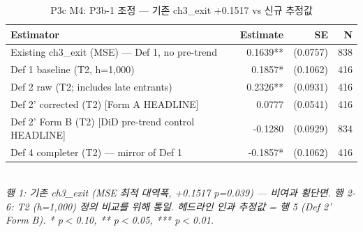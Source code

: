 \begin{table}[t]
\centering
\caption{P3c M4: P3b-1 조정 — 기존 ch3\_exit +0.1517 vs 신규 추정값}
\label{tab:ch5_reconciliation_ko}
\begin{tabular}{p{6.5cm}rrr}
\toprule
Estimator & Estimate & SE & N \\
\midrule
Existing ch3_exit (MSE) — Def 1, no pre-trend & 0.1639** & (0.0757) & 838 \\
Def 1 baseline (T2, h=1,000) & 0.1857* & (0.1062) & 416 \\
Def 2 raw (T2; includes late entrants) & 0.2326** & (0.0931) & 416 \\
Def 2' corrected (T2) [Form A HEADLINE] & 0.0777 & (0.0541) & 416 \\
Def 2' Form B (T2) [DiD pre-trend control HEADLINE] & -0.1280 & (0.0929) & 834 \\
Def 4 completer (T2) — mirror of Def 1 & -0.1857* & (0.1062) & 416 \\
\bottomrule
\end{tabular}\\
\footnotesize\textit{행 1: 기존 ch3\_exit (MSE 최적 대역폭, +0.1517 p=0.039) — 비여과 횡단면. 행 2-6: T2 (h=1,000) 정의 비교를 위해 통일. 헤드라인 인과 추정값 = 행 5 (Def 2' Form B). * p$<$0.10, ** p$<$0.05, *** p$<$0.01.}
\end{table}

